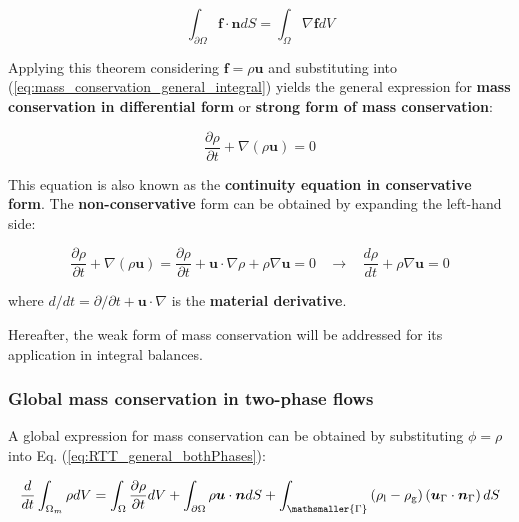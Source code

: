 \begin{equation}
\label{eq:gauss_theorem}
\int_{\partial \Omega} \boldsymbol{f} \cdot \boldsymbol{n} dS = \int_\Omega \nabla \boldsymbol{f}  dV
\end{equation}

Applying this theorem considering $\boldsymbol{f} = \rho \boldsymbol{u}$ and substituting into (\ref{eq:mass_conservation_general_integral}) yields the general expression for \textbf{mass conservation in differential form} or \textbf{strong form of mass conservation}:

\begin{equation}
\label{eq:mass_conservation_general_differential}
\boxed{
\frac{\partial \rho}{\partial t} + \nabla \left( \rho \boldsymbol{u} \right) = 0
}
\end{equation}

This equation is also known as the \textbf{continuity equation in conservative form}. The \textbf{non-conservative} form can be obtained by expanding the left-hand side:

\begin{equation}
\frac{\partial \rho}{\partial t} + \nabla \left( \rho \boldsymbol{u} \right) = \frac{\partial \rho}{\partial t} + \boldsymbol{u} \cdot \nabla \rho  + \rho \nabla \boldsymbol{u} = 0 ~~~~ \rightarrow ~~~~ \frac{d \rho}{d t} + \rho \nabla \boldsymbol{u} = 0
\end{equation}

where $d / d t = \partial / \partial t + \boldsymbol{u} \cdot \nabla $ is the \textbf{material derivative}. 

Hereafter, the weak form of mass conservation will be addressed for its application in integral balances.

\subsubsection*{Global mass conservation in two-phase flows}

A global expression for mass conservation can be obtained by substituting $\phi = \rho$ into Eq. (\ref{eq:RTT_general_bothPhases}):

\begin{equation}
\frac{d}{dt} \int_{\Omega_m} \rho dV =   \int_{\Omega}  \frac{\partial \rho}{\partial t}  dV + \int_{\partial \Omega} \rho \boldsymbol{u} \cdot \boldsymbol{n} dS + \int_\mathsmaller{\Gamma} \left( \rho_\mathrm{l} - \rho_\mathrm{g} \right) \left( \boldsymbol{u}_{\scriptsize{\Gamma}} \cdot \boldsymbol{n}_{\scriptsize{\Gamma}} \right) dS
\end{equation}

